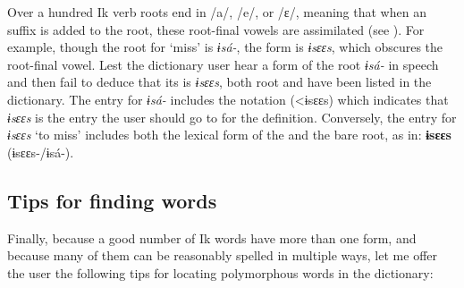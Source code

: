 
Over a hundred Ik verb roots end in /a/, /e/, or /ɛ/, meaning that when an  suffix is added to the root, these root-final vowels are assimilated (see ). For example, though the root for ‘miss’ is \textit{ɨsá-}, the  form is \textit{ɨsɛɛs}, which obscures the root-final vowel. Lest the dictionary user hear a form of the root \textit{ɨsá-} in speech and then fail to deduce that its  is \textit{ɨsɛɛs}, both root and  have been listed in the dictionary. The entry for \textit{ɨsá-} includes the notation (<ɨsɛɛs) which indicates that \textit{ɨsɛɛs }is the entry the user should go to for the definition. Conversely, the entry for \textit{ɨsɛɛs} ‘to miss’ includes both the lexical form of the  and the bare root, as in: \textbf{ɨsɛɛs}\textit{ }(ɨsɛɛs{\Í}-/ɨsá-). 
 
\subsection{Tips for finding words}\label{sec:1.3.3}

Finally, because a good number of Ik words have more than one form, and because many of them can be reasonably spelled in multiple ways, let me offer the user the following tips for locating polymorphous words in the dictionary:

